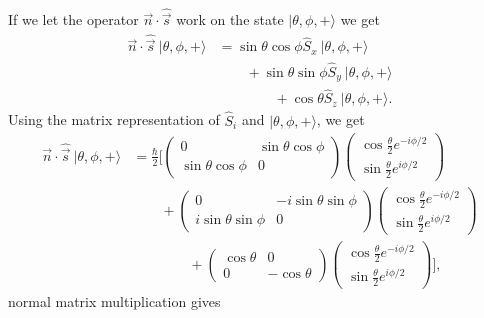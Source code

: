 \documentclass[a4paper, 11pt, titlepage, english]{article}
\newcommand{\ket}[1]{|#1 \rangle}
\newcommand{\op}[1]{\hat{#1}}
\begin{document}
If we let the operator $\vec{n}\cdot\op{\vec{s}}$ work on the state $\ket{\theta, \phi, +}$ we get
\begin{align*}
 \vec{n}\cdot\op{\vec{s}}\ \ket{\theta, \phi, +} &= \sin\theta\cos\phi \op{S}_x\ \ket{\theta, \phi, +} \\ &\qquad +  \sin\theta\sin\phi\op{S}_y\ \ket{\theta, \phi, +} \\ &\qquad\qquad + \cos\theta \op{S}_z\ \ket{\theta, \phi, +}.
\end{align*}
Using the matrix representation of $\op{S}_i$ and $\ket{\theta, \phi, +}$, we get
\begin{align*}
 \vec{n}\cdot\op{\vec{s}}\ \ket{\theta, \phi, +} &= \frac{\hbar}{2}\Bigg[
\begin{pmatrix}
0 & \sin\theta\cos\phi \\ \sin\theta\cos\phi & 0  
\end{pmatrix} \begin{pmatrix}
\cos\frac{\theta}{2}e^{-i\phi/2} \\[0.4cm]
 \sin{\frac{\theta}{2}}e^{i\phi/2}
\end{pmatrix} \\
% 
&\qquad + \begin{pmatrix}
0 & -i\sin\theta\sin\phi \\ i\sin\theta\sin\phi & 0  
\end{pmatrix} \begin{pmatrix}
\cos\frac{\theta}{2}e^{-i\phi/2} \\[0.4cm]
 \sin{\frac{\theta}{2}}e^{i\phi/2}
\end{pmatrix} \\
% 
&\qquad\qquad + \begin{pmatrix}
\cos\theta & 0 \\ 0 & -\cos\theta  
\end{pmatrix} \begin{pmatrix}
\cos\frac{\theta}{2}e^{-i\phi/2} \\[0.4cm]
 \sin{\frac{\theta}{2}}e^{i\phi/2}
\end{pmatrix} \Bigg],
\end{align*}
normal matrix multiplication gives
\end{document}
